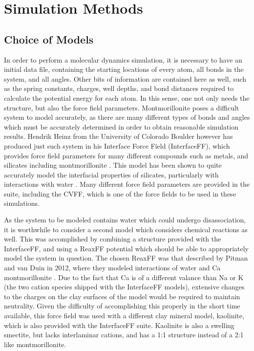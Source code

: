 	\section{Simulation Methods}
	
		\subsection{Choice of Models}
			In order to perform a molecular dynamics simulation, it is necessary to have an initial data file, containing the starting locations of every atom, all bonds in the system, and all angles. Other bits of information are contained here as well, such as the spring constants, charges, well depths, and bond distances required to calculate the potential energy for each atom. In this sense, one not only needs the structure, but also the force field parameters. Montmorillonite poses a difficult system to model accurately, as there are many different types of bonds and angles which must be accurately determined in order to obtain reasonable simulation results. Hendrik Heinz from the University of Colorado Boulder however has produced just such system in his Interface Force Field (InterfaceFF), which provides force field parameters for many different compounds such as metals, and silicates including montmorillonite \cite{heinz2013thermodynamically}. This model has been shown to quite accurately model the interfacial properties of silicates, particularly with interactions with water \cite{emami2014force}. Many different force field parameters are provided in the suite, including the CVFF, which is one of the force fields to be used in these simulations.
			
			As the system to be modeled contains water which could undergo disassociation, it is worthwhile to consider a second model which considers chemical reactions as well. This was accomplished by combining a structure provided with the InterfaceFF, and using a ReaxFF potential which should be able to appropriately model the system in question. The chosen ReaxFF was that described by Pitman and van Duin in 2012, where they modeled interactions of water and Ca montmorillonite \cite{pitman2012dynamics}. Due to the fact that Ca is of a different valance than Na or K (the two cation species shipped with the InterfaceFF models), extensive changes to the charges on the clay surfaces of the model would be required to maintain neutrality. Given the difficulty of accomplishing this properly in the short time available, this force field was used with a different clay mineral model, kaolinite, which is also provided with the InterfaceFF suite. Kaolinite is also a swelling smectite, but lacks interlaminar cations, and has a 1:1 structure instead of a 2:1 like montmorillonite.
			
